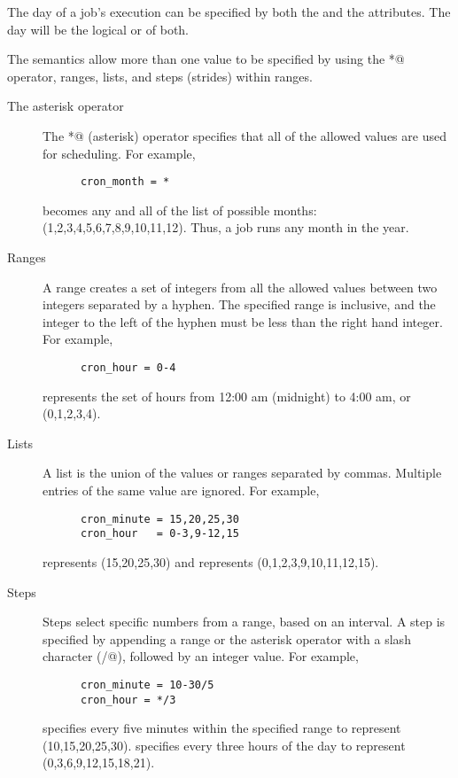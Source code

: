 The day of a job's execution can be specified 
by both the  
and the  attributes. 
The day will be the logical or of both.

The semantics allow more than one value to be specified 
by using the \verb@*@ operator,
ranges, lists, and steps (strides) within ranges.

\begin{description}
   \item[The asterisk operator]
   The \verb@*@ (asterisk) operator specifies that all of the 
   allowed values are used for scheduling.
   For example,
   \begin{verbatim}
      cron_month = *
   \end{verbatim}
   becomes any and all of the list of possible months:
   (1,2,3,4,5,6,7,8,9,10,11,12).
   Thus, a job runs any month in the year.

   \item[Ranges]
   A range creates a set of integers from all the allowed values between two
   integers separated by a hyphen. The specified range is inclusive, and the
   integer to the left of the hyphen must be less than the right hand integer.
   For example,
   \begin{verbatim}
      cron_hour = 0-4
   \end{verbatim}
   represents the set of
   hours from 12:00 am (midnight) to 4:00 am, or (0,1,2,3,4).
   
   \item[Lists]
   A list is the union of the values or ranges separated by commas. Multiple
   entries of the same value are ignored. 
   For example,
   \begin{verbatim}
      cron_minute = 15,20,25,30
      cron_hour   = 0-3,9-12,15
   \end{verbatim}
    represents (15,20,25,30)
   and  represents (0,1,2,3,9,10,11,12,15).
      
   \item[Steps]
   Steps select specific numbers from a range, based on an interval.
   A step is specified by appending a range or the asterisk
   operator with a slash character (\verb@/@),
   followed by an integer value.
   For example,
   \begin{verbatim}
      cron_minute = 10-30/5
      cron_hour = */3
   \end{verbatim}
    specifies
   every five minutes within the specified range 
   to represent (10,15,20,25,30).
    specifies every three hours of the day
   to represent (0,3,6,9,12,15,18,21).
   

\end{description}

